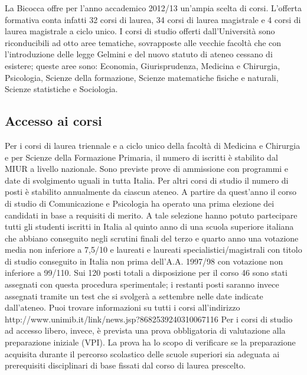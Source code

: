 La Bicocca offre per l'anno accademico 2012/13 un'ampia scelta di corsi. L'offerta formativa conta infatti 32 corsi di laurea, 34 corsi di laurea magistrale e 4 corsi di laurea magistrale a ciclo unico. I corsi di studio offerti dall'Università sono riconducibili ad otto aree tematiche, sovrapposte alle vecchie facoltà che  con l'introduzione delle legge Gelmini e del nuovo statuto di ateneo cessano di esistere; queste aree sono: Economia, Giurisprudenza, Medicina e Chirurgia, Psicologia, Scienze della formazione, Scienze matematiche fisiche e naturali, Scienze statistiche e Sociologia. 

\subsection{Accesso ai corsi}
Per i corsi di laurea triennale e a ciclo unico della facoltà di Medicina e Chirurgia e per Scienze della Formazione Primaria, il numero di iscritti è stabilito dal MIUR a livello nazionale. Sono previste prove di ammissione con programmi e date di svolgimento uguali in tutta Italia. Per altri corsi di studio il numero di posti è stabilito annualmente da ciascun ateneo. A partire da quest'anno il corso di studio di Comunicazione e Psicologia ha operato una prima elezione dei candidati in base a requisiti di merito. A tale selezione hanno potuto partecipare tutti gli studenti iscritti in Italia al quinto anno di una scuola superiore italiana che abbiano conseguito negli scrutini finali del terzo e quarto anno una votazione media non inferiore a 7,5/10 e laureati e laureati specialistici/magistrali con titolo di studio conseguito in Italia non prima dell'A.A. 1997/98 con votazione non inferiore a 99/110. Sui 120 posti totali a disposizione per il corso 46 sono stati assegnati con questa procedura sperimentale; i restanti posti saranno invece assegnati tramite un test che si svolgerà a settembre nelle date indicate dall'ateneo.
Puoi trovare informazioni su tutti i corsi all'indirizzo http://www.unimib.it/link/news.jsp?8682539240310067116
Per i corsi di studio ad accesso libero, invece, è prevista una prova obbligatoria di valutazione alla preparazione iniziale (VPI). La prova ha lo scopo di verificare se la preparazione acquisita durante il percorso scolastico delle scuole superiori sia adeguata ai prerequisiti disciplinari di base fissati dal corso di laurea prescelto. 

